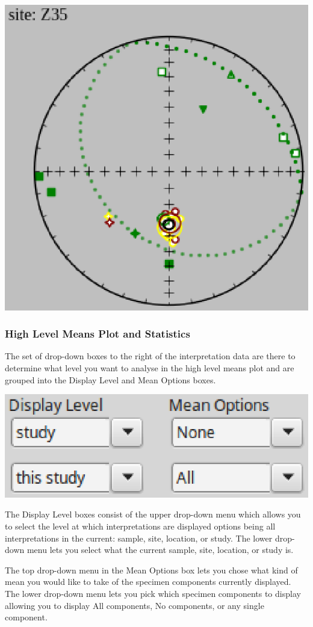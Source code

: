 \documentclass[11pt]{book}
\begin{document}
{{\includegraphics[width=10 cm]{EPSFiles/demag_gui_CheckSampleOrient.eps}

\subsubsection{High Level Means Plot and
Statistics}\label{higher-level-plots-and-interpretation}

The set of drop-down boxes to the right of the interpretation data are there to determine what level you want to analyse in the high level means plot and are grouped into the Display Level and Mean Options boxes.

\includegraphics[width=8 cm]{EPSFiles/demag_gui_HighLevel.eps}

\noindent The Display Level boxes consist of the upper drop-down menu which allows you to select the level at which interpretations are displayed options being all interpretations in the current: sample, site, location, or study. The lower drop-down menu lets you select what the current sample, site, location, or study is.

\noindent The top drop-down menu in the Mean Options box lets you chose what kind of mean you would like to take of the specimen components currently displayed. The lower drop-down menu lets you pick which specimen components to display allowing you to display All components, No components, or any single component.

}}
\end{document}
